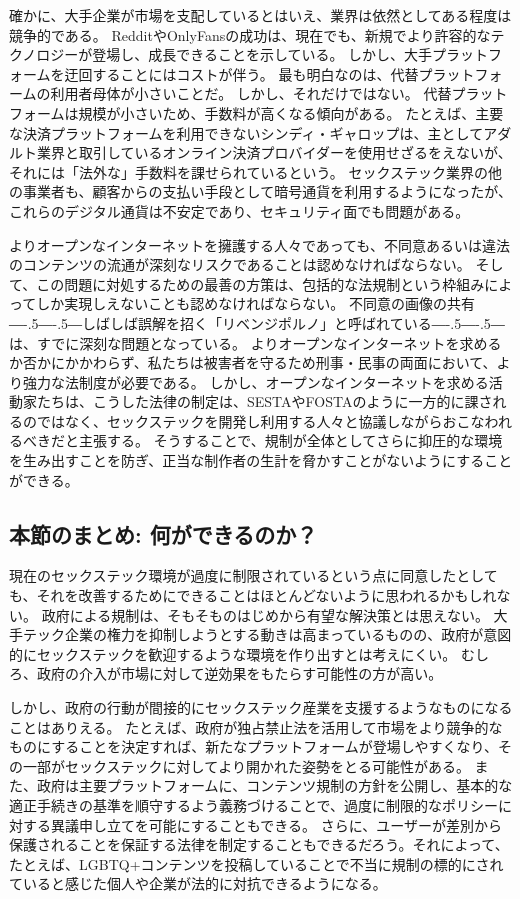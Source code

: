 \documentclass[paper=a4,book,openany]{jlreq}
\def\DDASH{―\kern-.5\zw―\kern-.5\zw―}
\begin{document}
確かに、大手企業が市場を支配しているとはいえ、業界は依然としてある程度は競争的である。
RedditやOnlyFansの成功は、現在でも、新規でより許容的なテクノロジーが登場し、成長できることを示している。
しかし、大手プラットフォームを迂回することにはコストが伴う。
最も明白なのは、代替プラットフォームの利用者母体が小さいことだ。
しかし、それだけではない。
代替プラットフォームは規模が小さいため、手数料が高くなる傾向がある。
たとえば、主要な決済プラットフォームを利用できないシンディ・ギャロップは、主としてアダルト業界と取引しているオンライン決済プロバイダーを使用せざるをえないが、それには「法外な」手数料を課せられているという。
セックステック業界の他の事業者も、顧客からの支払い手段として暗号通貨を利用するようになったが、これらのデジタル通貨は不安定であり、セキュリティ面でも問題がある。

よりオープンなインターネットを擁護する人々であっても、不同意あるいは違法のコンテンツの流通が深刻なリスクであることは認めなければならない。
そして、この問題に対処するための最善の方策は、包括的な法規制という枠組みによってしか実現しえないことも認めなければならない。
不同意の画像の共有{\DDASH}しばしば誤解を招く「リベンジポルノ」と呼ばれている{\DDASH}は、すでに深刻な問題となっている。
よりオープンなインターネットを求めるか否かにかかわらず、私たちは被害者を守るため刑事・民事の両面において、より強力な法制度が必要である\citep{kibbe20:_faceb_has_banned_ads_kink}。
しかし、オープンなインターネットを求める活動家たちは、こうした法律の制定は、SESTAやFOSTAのように一方的に課されるのではなく、セックステックを開発し利用する人々と協議しながらおこなわれるべきだと主張する。
そうすることで、規制が全体としてさらに抑圧的な環境を生み出すことを防ぎ、正当な制作者の生計を脅かすことがないようにすることができる。

\subsection{本節のまとめ: 何ができるのか？}

現在のセックステック環境が過度に制限されているという点に同意したとしても、それを改善するためにできることはほとんどないように思われるかもしれない。
政府による規制は、そもそものはじめから有望な解決策とは思えない。
大手テック企業の権力を抑制しようとする動きは高まっているものの、政府が意図的にセックステックを歓迎するような環境を作り出すとは考えにくい。
むしろ、政府の介入が市場に対して逆効果をもたらす可能性の方が高い。

しかし、政府の行動が間接的にセックステック産業を支援するようなものになることはありえる。
たとえば、政府が独占禁止法を活用して市場をより競争的なものにすることを決定すれば、新たなプラットフォームが登場しやすくなり、その一部がセックステックに対してより開かれた姿勢をとる可能性がある。
また、政府は主要プラットフォームに、コンテンツ規制の方針を公開し、基本的な適正手続きの基準を順守するよう義務づけることで、過度に制限的なポリシーに対する異議申し立てを可能にすることもできる。
さらに、ユーザーが差別から保護されることを保証する法律を制定することもできるだろう。それによって、たとえば、LGBTQ+コンテンツを投稿していることで不当に規制の標的にされていると感じた個人や企業が法的に対抗できるようになる。
\end{document}
